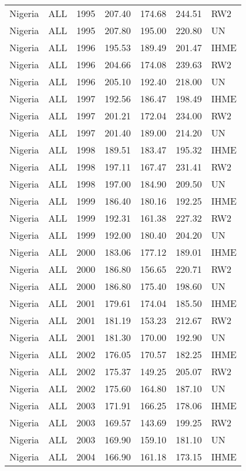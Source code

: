 \begin{longtable}{lllrrrl}
  Nigeria & ALL & 1995 & 207.40 & 174.68 & 244.51 & RW2 \\ 
  Nigeria & ALL & 1995 & 207.80 & 195.00 & 220.80 & UN \\ 
  Nigeria & ALL & 1996 & 195.53 & 189.49 & 201.47 & IHME \\ 
  Nigeria & ALL & 1996 & 204.66 & 174.08 & 239.63 & RW2 \\ 
  Nigeria & ALL & 1996 & 205.10 & 192.40 & 218.00 & UN \\ 
  Nigeria & ALL & 1997 & 192.56 & 186.47 & 198.49 & IHME \\ 
  Nigeria & ALL & 1997 & 201.21 & 172.04 & 234.00 & RW2 \\ 
  Nigeria & ALL & 1997 & 201.40 & 189.00 & 214.20 & UN \\ 
  Nigeria & ALL & 1998 & 189.51 & 183.47 & 195.32 & IHME \\ 
  Nigeria & ALL & 1998 & 197.11 & 167.47 & 231.41 & RW2 \\ 
  Nigeria & ALL & 1998 & 197.00 & 184.90 & 209.50 & UN \\ 
  Nigeria & ALL & 1999 & 186.40 & 180.16 & 192.25 & IHME \\ 
  Nigeria & ALL & 1999 & 192.31 & 161.38 & 227.32 & RW2 \\ 
  Nigeria & ALL & 1999 & 192.00 & 180.40 & 204.20 & UN \\ 
  Nigeria & ALL & 2000 & 183.06 & 177.12 & 189.01 & IHME \\ 
  Nigeria & ALL & 2000 & 186.80 & 156.65 & 220.71 & RW2 \\ 
  Nigeria & ALL & 2000 & 186.80 & 175.40 & 198.60 & UN \\ 
  Nigeria & ALL & 2001 & 179.61 & 174.04 & 185.50 & IHME \\ 
  Nigeria & ALL & 2001 & 181.19 & 153.23 & 212.67 & RW2 \\ 
  Nigeria & ALL & 2001 & 181.30 & 170.00 & 192.90 & UN \\ 
  Nigeria & ALL & 2002 & 176.05 & 170.57 & 182.25 & IHME \\ 
  Nigeria & ALL & 2002 & 175.37 & 149.25 & 205.07 & RW2 \\ 
  Nigeria & ALL & 2002 & 175.60 & 164.80 & 187.10 & UN \\ 
  Nigeria & ALL & 2003 & 171.91 & 166.25 & 178.06 & IHME \\ 
  Nigeria & ALL & 2003 & 169.57 & 143.69 & 199.25 & RW2 \\ 
  Nigeria & ALL & 2003 & 169.90 & 159.10 & 181.10 & UN \\ 
  Nigeria & ALL & 2004 & 166.90 & 161.18 & 173.15 & IHME \\ 

\end{longtable}
